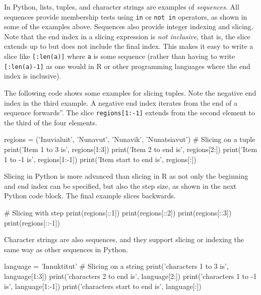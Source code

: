 In Python, lists, tuples, and character strings are examples of \emph{sequences}. All sequences provide membership tests using \texttt{in} or \texttt{not in} operators, as shown in some of the examples above. Sequences also provide integer indexing and slicing.  Note that the end index in a slicing expression is \emph{not inclusive}, that is, the slice extends up to but does not include the final index. This makes it easy to write a slice like \texttt{[:len(a)]} where \texttt{a} is some sequence (rather than having to write \texttt{[:len(a)-1]} as one would in R or other programming languages where the end index is inclusive).

The following code shows some examples for slicing tuples. Note the negative end index in the third example. A negative end index iterates from the end of a sequence forwards''. The slice \texttt{regions[1:-1]} extends from the second element to the third of the four elements. 

\begin{samepage}
\begin{pythoncode}
regions = ('Inuvialuit', 'Nunavut', 
           'Nunavik', 'Nunatsiavut')
# Slicing on a tuple
print('Item 1 to 3 is', regions[1:3])
print('Item 2 to end is', regions[2:])
print('Item 1 to -1 is', regions[1:-1])
print('Item start to end is', regions[:])
\end{pythoncode}
\end{samepage}

Slicing in Python is more advanced than slicing in R as not only the beginning and end index can be specified, but also the step size, as shown in the next Python code block. The final example slices backwards.

\begin{samepage}
\begin{pythoncode}
# Slicing with step
print(regions[::1])
print(regions[::2])
print(regions[::3])
print(regions[::-1])
\end{pythoncode}
\end{samepage}

Character strings are also sequences, and they support slicing or indexing the same way as other sequences in Python.

\begin{samepage}
\begin{pythoncode}
language = 'Innuktitut'
# Slicing on a string 
print('characters 1 to 3 is', language[1:3])
print('characters 2 to end is', language[2:])
print('characters 1 to -1 is', language[1:-1])
print('characters start to end is', language[:])
\end{pythoncode}
\end{samepage}

